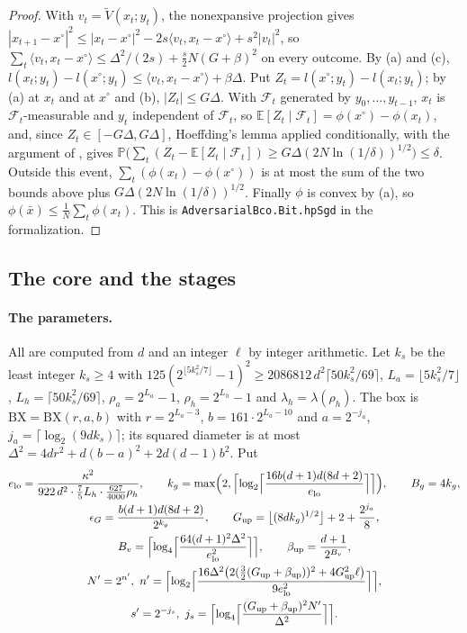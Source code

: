 \documentclass[11pt]{amsart}
\theoremstyle{definition}
\numberwithin{equation}{section}
\newcommand{\E}{\mathbb{E}}
\newcommand{\Prob}{\mathbb{P}}
\newcommand{\cF}{\mathscr{F}}
\newcommand{\ip}[1]{\langle #1\rangle}
\begin{document}
\begin{proof}
With $v_t=\tilde V(x_t;y_t)$, the nonexpansive projection gives $|x_{t+1}-x^\circ|^2\le|x_t-x^\circ|^2-2s\ip{v_t,x_t-x^\circ}+s^2|v_t|^2$, so $\sum_t\ip{v_t,x_t-x^\circ}\le\Delta^2/(2s)+\frac s2N(G+\beta)^2$ on every outcome. By (a) and (c), $l(x_t;y_t)-l(x^\circ;y_t)\le\ip{v_t,x_t-x^\circ}+\beta\Delta$. Put $Z_t=l(x^\circ;y_t)-l(x_t;y_t)$; by (a) at $x_t$ and at $x^\circ$ and (b), $|Z_t|\le G\Delta$. With $\cF_t$ generated by $y_0,\dots,y_{t-1}$, $x_t$ is $\cF_t$-measurable and $y_t$ independent of $\cF_t$, so $\E[Z_t\mid\cF_t]=\phi(x^\circ)-\phi(x_t)$, and, since $Z_t\in[-G\Delta,G\Delta]$, Hoeffding's lemma \cite[inequality~(4.16)]{Hoe63} applied conditionally, with the argument of \cite{Azuma67}, gives $\Prob\bigl(\sum_t(Z_t-\E[Z_t\mid\cF_t])\ge G\Delta(2N\ln(1/\delta))^{1/2}\bigr)\le\delta$. Outside this event, $\sum_t(\phi(x_t)-\phi(x^\circ))$ is at most the sum of the two bounds above plus $G\Delta(2N\ln(1/\delta))^{1/2}$. Finally $\phi$ is convex by (a), so $\phi(\bar x)\le\frac1N\sum_t\phi(x_t)$.
This is \texttt{AdversarialBco.Bit.hpSgd} in the formalization.
\end{proof}

\subsection{The core and the stages}

\paragraph{The parameters.} All are computed from $d$ and an integer $\ell$ by integer arithmetic. Let $k_s$ be the least integer $k_s\ge4$ with $125(2^{\lfloor5k_s^2/7\rfloor}-1)^2\ge2086812\,d^2\lceil50k_s^2/69\rceil$, $L_a=\lfloor5k_s^2/7\rfloor$, $L_h=\lceil50k_s^2/69\rceil$, $\rho_a=2^{L_a}-1$, $\rho_h=2^{L_h}-1$ and $\lambda_h=\lambda(\rho_h)$. The box is $\mathrm{BX}=\mathrm{BX}(r,a,b)$ with $r=2^{L_a-3}$, $b=161\cdot2^{L_a-10}$ and $a=2^{-j_a}$, $j_a=\lceil\log_2(9dk_s)\rceil$; its squared diameter is at most $\Delta^2=4dr^2+d(b-a)^2+2d(d-1)b^2$. Put
\begin{gather*}
e_{\mathrm{lo}}=\frac{\kappa^2}{922\,d^2\cdot\frac75L_h\cdot\frac{627}{4000}\rho_h},\qquad k_g=\max\Bigl(2,\Bigl\lceil\log_2\Bigl\lceil\frac{16b(d+1)d(8d+2)}{e_{\mathrm{lo}}}\Bigr\rceil\Bigr\rceil\Bigr),\qquad B_g=4k_g,\\
\epsilon_G=\frac{b(d+1)d(8d+2)}{2^{k_g}},\qquad G_{\mathrm{up}}=\bigl\lfloor(8dk_g)^{1/2}\bigr\rfloor+2+\frac{2^{j_a}}8,\\
B_v=\Bigl\lceil\log_4\Bigl\lceil\frac{64(d+1)^2\Delta^2}{e_{\mathrm{lo}}^2}\Bigr\rceil\Bigr\rceil,\qquad\beta_{\mathrm{up}}=\frac{d+1}{2^{B_v}},\\
N'=2^{n'},\ n'=\Bigl\lceil\log_2\Bigl\lceil\frac{16\Delta^2\bigl(2(\frac32(G_{\mathrm{up}}+\beta_{\mathrm{up}}))^2+4G_{\mathrm{up}}^2\ell\bigr)}{9e_{\mathrm{lo}}^2}\Bigr\rceil\Bigr\rceil,\\
s'=2^{-j_s},\ j_s=\Bigl\lceil\log_4\Bigl\lceil\frac{(G_{\mathrm{up}}+\beta_{\mathrm{up}})^2N'}{\Delta^2}\Bigr\rceil\Bigr\rceil .
\end{gather*}
\end{document}
